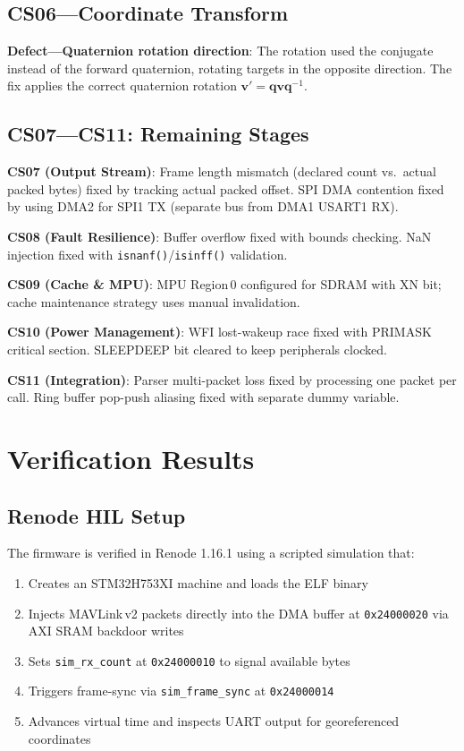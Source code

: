 \documentclass[conference,a4paper]{IEEEtran}
\begin{document}
\subsection{CS06---Coordinate Transform}

\textbf{Defect---Quaternion rotation direction}: The rotation used the conjugate instead of the forward quaternion, rotating targets in the opposite direction. The fix applies the correct quaternion rotation $\mathbf{v}' = \mathbf{q} \mathbf{v} \mathbf{q}^{-1}$.

\subsection{CS07---CS11: Remaining Stages}

\textbf{CS07 (Output Stream)}: Frame length mismatch (declared count vs.\ actual packed bytes) fixed by tracking actual packed offset. SPI DMA contention fixed by using DMA2 for SPI1 TX (separate bus from DMA1 USART1 RX).

\textbf{CS08 (Fault Resilience)}: Buffer overflow fixed with bounds checking. NaN injection fixed with \texttt{isnanf()}/\texttt{isinff()} validation.

\textbf{CS09 (Cache \& MPU)}: MPU Region\,0 configured for SDRAM with XN bit; cache maintenance strategy uses manual invalidation.

\textbf{CS10 (Power Management)}: WFI lost-wakeup race fixed with PRIMASK critical section. SLEEPDEEP bit cleared to keep peripherals clocked.

\textbf{CS11 (Integration)}: Parser multi-packet loss fixed by processing one packet per call. Ring buffer pop-push aliasing fixed with separate dummy variable.

\section{Verification Results}
\label{sec:verification}

\subsection{Renode HIL Setup}

The firmware is verified in Renode 1.16.1 using a scripted simulation that:
\begin{enumerate}
\item Creates an STM32H753XI machine and loads the ELF binary
\item Injects MAVLink\,v2 packets directly into the DMA buffer at \texttt{0x24000020} via AXI SRAM backdoor writes
\item Sets \texttt{sim\_rx\_count} at \texttt{0x24000010} to signal available bytes
\item Triggers frame-sync via \texttt{sim\_frame\_sync} at \texttt{0x24000014}
\item Advances virtual time and inspects UART output for georeferenced coordinates
\end{enumerate}
\end{document}
